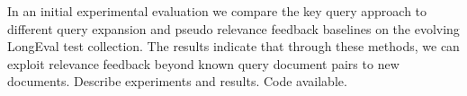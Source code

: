 In an initial experimental evaluation we compare the key query approach to different query expansion and pseudo relevance feedback baselines on the evolving LongEval test collection. The results indicate that through these methods, we can exploit relevance feedback beyond known query document pairs to new documents. {\color{red} Describe experiments and results. Code available.}



